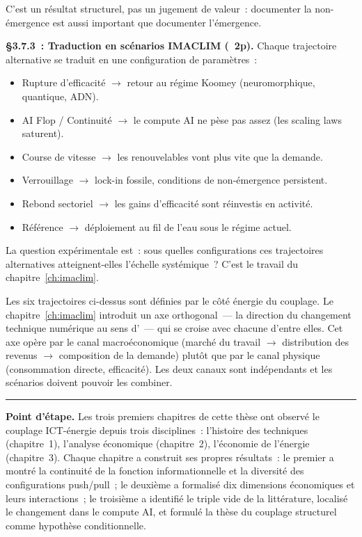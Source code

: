 {C'est un r\'esultat structurel, pas un jugement de valeur~: documenter la non-\'emergence est aussi important que documenter l'\'emergence.

\textbf{\S3.7.3~: Traduction en sc\'enarios IMACLIM (~2p).}
Chaque trajectoire alternative se traduit en une configuration de param\`etres~:
\begin{itemize}
\item \og Rupture d'efficacit\'e\fg{} $\to$ retour au r\'egime Koomey (neuromorphique, quantique, ADN).
\item \og AI Flop / Continuit\'e\fg{} $\to$ le compute AI ne p\`ese pas assez (les scaling laws saturent).
\item \og Course de vitesse\fg{} $\to$ les renouvelables vont plus vite que la demande.
\item \og Verrouillage\fg{} $\to$ lock-in fossile, conditions de non-\'emergence persistent.
\item \og Rebond sectoriel\fg{} $\to$ les gains d'efficacit\'e sont r\'einvestis en activit\'e.
\item \og R\'ef\'erence\fg{} $\to$ d\'eploiement au fil de l'eau sous le r\'egime actuel.
\end{itemize}

La question exp\'erimentale est~: sous quelles configurations ces trajectoires alternatives atteignent-elles l'\'echelle syst\'emique~? C'est le travail du chapitre~\ref{ch:imaclim}.

Les six trajectoires ci-dessus sont d\'efinies par le c\^ot\'e \'energie du couplage. Le chapitre~\ref{ch:imaclim} introduit un axe orthogonal~--- la direction du changement technique num\'erique au sens d'\textcite{acemoglu_building_2026}~--- qui se croise avec chacune d'entre elles. Cet axe op\`ere par le canal macro\'economique (march\'e du travail $\rightarrow$ distribution des revenus $\rightarrow$ composition de la demande) plut\^ot que par le canal physique (consommation directe, efficacit\'e). Les deux canaux sont ind\'ependants et les sc\'enarios doivent pouvoir les combiner.}

\bigskip
\begin{center}\rule{0.5\textwidth}{0.4pt}\end{center}
\bigskip

\noindent\textbf{Point d'\'etape.} Les trois premiers chapitres de cette th\`ese ont observ\'e le couplage ICT-\'energie depuis trois disciplines~: l'histoire des techniques (chapitre~1), l'analyse \'economique (chapitre~2), l'\'economie de l'\'energie (chapitre~3). Chaque chapitre a construit ses propres r\'esultats~: le premier a montr\'e la continuit\'e de la fonction informationnelle et la diversit\'e des configurations push/pull~; le deuxi\`eme a formalis\'e dix dimensions \'economiques et leurs interactions~; le troisi\`eme a identifi\'e le triple vide de la litt\'erature, localis\'e le changement dans le compute AI, et formul\'e la th\`ese du couplage structurel comme hypoth\`ese conditionnelle.


